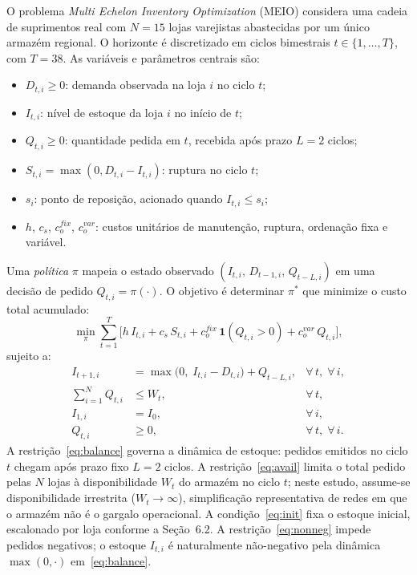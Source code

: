 \documentclass[a4paper,11pt]{article}
\begin{document}
O problema \textit{Multi Echelon Inventory Optimization} (MEIO)
considera uma cadeia de suprimentos real com $N = 15$ lojas
varejistas abastecidas por um único armazém regional. O horizonte é
discretizado em ciclos bimestrais $t \in \{1, \ldots, T\}$, com
$T = 38$. As variáveis e parâmetros centrais são:

\begin{itemize}
  \item $D_{t,i} \geq 0$: demanda observada na loja $i$ no ciclo $t$;
  \item $I_{t,i}$: nível de estoque da loja $i$ no início de $t$;
  \item $Q_{t,i} \geq 0$: quantidade pedida em $t$, recebida após
    prazo $L = 2$ ciclos;
  \item $S_{t,i} = \max(0, D_{t,i} - I_{t,i})$: ruptura no ciclo $t$;
  \item $s_i$: ponto de reposição, acionado quando $I_{t,i} \leq s_i$;
  \item $h$, $c_s$, $c_o^{fix}$, $c_o^{var}$: custos unitários de
    manutenção, ruptura, ordenação fixa e variável.
\end{itemize}

Uma \emph{política} $\pi$ mapeia o estado observado
$(I_{t,i},\, D_{t-1,i},\, Q_{t-L,i})$ em uma decisão de pedido
$Q_{t,i} = \pi(\cdot)$. O objetivo é determinar $\pi^*$ que minimize
o custo total acumulado:
\begin{equation}
  \min_\pi \sum_{t=1}^{T} \bigl[
    h\, I_{t,i} + c_s\, S_{t,i}
    + c_o^{fix}\,\mathbf{1}(Q_{t,i}>0)
    + c_o^{var}\, Q_{t,i}
  \bigr],
  \label{eq:obj}
\end{equation}
sujeito a:
\begin{align}
  I_{t+1,i} &= \max\bigl(0,\; I_{t,i} - D_{t,i}\bigr) + Q_{t-L,i},
    & \forall\, t,\; \forall\, i, \label{eq:balance} \\
  \sum_{i=1}^{N} Q_{t,i} &\leq W_t,
    & \forall\, t, \label{eq:avail} \\
  I_{1,i} &= I_0,
    & \forall\, i, \label{eq:init} \\
  Q_{t,i} &\geq 0,
    & \forall\, t,\; \forall\, i. \label{eq:nonneg}
\end{align}
A restrição~\eqref{eq:balance} governa a dinâmica de estoque: pedidos
emitidos no ciclo $t$ chegam após prazo fixo $L = 2$ ciclos.
A restrição~\eqref{eq:avail} limita o total pedido pelas $N$ lojas
à disponibilidade $W_t$ do armazém no ciclo $t$; neste estudo,
assume-se disponibilidade irrestrita ($W_t \to \infty$),
simplificação representativa de redes em que o armazém não é o
gargalo operacional. A condição~\eqref{eq:init} fixa o estoque
inicial, escalonado por loja conforme a Seção~6.2. A
restrição~\eqref{eq:nonneg} impede pedidos negativos; o estoque
$I_{t,i}$ é naturalmente não-negativo pela dinâmica $\max(0,\cdot)$
em~\eqref{eq:balance}.
\end{document}
